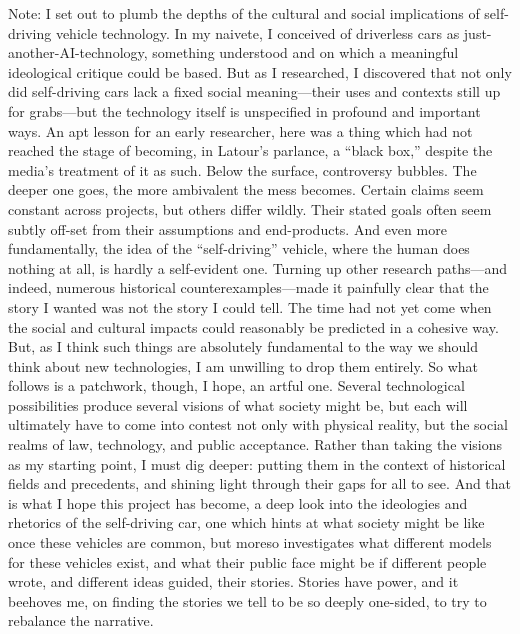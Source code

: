 Note: I set out to plumb the depths of the cultural and social
implications of self-driving vehicle technology. In my naivete, I
conceived of driverless cars as just-another-AI-technology, something
understood and on which a meaningful ideological critique could be
based. But as I researched, I discovered that not only did
self-driving cars lack a fixed social meaning---their uses and
contexts still up for grabs---but the technology itself is unspecified
in profound and important ways. An apt lesson for an early researcher,
here was a thing which had not reached the stage of becoming, in
Latour's parlance, a ``black box,'' despite the media's treatment of
it as such. Below the surface, controversy bubbles. The deeper one
goes, the more ambivalent the mess becomes. Certain claims seem
constant across projects, but others differ wildly. Their stated goals
often seem subtly off-set from their assumptions and end-products. And
even more fundamentally, the idea of the ``self-driving'' vehicle,
where the human does nothing at all, is hardly a self-evident one.
Turning up other research paths---and indeed, numerous historical
counterexamples---made it painfully clear that the story I wanted was
not the story I could tell. The time had not yet come when the social
and cultural impacts could reasonably be predicted in a cohesive way.
But, as I think such things are absolutely fundamental to the way we
should think about new technologies, I am unwilling to drop them
entirely. So what follows is a patchwork, though, I hope, an artful
one. Several technological possibilities produce several visions of
what society might be, but each will ultimately have to come into
contest not only with physical reality, but the social realms of law,
technology, and public acceptance. Rather than taking the visions as
my starting point, I must dig deeper: putting them in the context of
historical fields and precedents, and shining light through their gaps
for all to see. And that is what I hope this project has become, a
deep look into the ideologies and rhetorics of the self-driving car,
one which hints at what society might be like once these
vehicles are common, but moreso investigates what different models for these vehicles
exist, and what their public face might be if different people wrote,
and different ideas guided, their stories. Stories have power, and it
beehoves me, on finding the stories we tell to be so deeply one-sided,
to try to rebalance the narrative.
